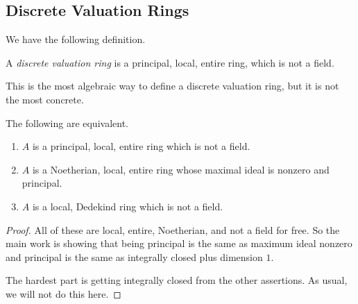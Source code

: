 \documentclass[../notes.tex]{subfiles}
\begin{document}
\subsection{Discrete Valuation Rings}
We have the following definition.
\begin{definition}
    A \textit{discrete valuation ring} is a principal, local, entire ring, which is not a field.
\end{definition}
This is the most algebraic way to define a discrete valuation ring, but it is not the most concrete.
\begin{proposition}
    The following are equivalent.
    \begin{enumerate}[label=(\alph*)]
        \item $A$ is a principal, local, entire ring which is not a field.
        \item $A$ is a Noetherian, local, entire ring whose maximal ideal is nonzero and principal.
        \item $A$ is a local, Dedekind ring which is not a field.
    \end{enumerate}
\end{proposition}
\begin{proof}
    All of these are local, entire, Noetherian, and not a field for free. So the main work is showing that being principal is the same as maximum ideal nonzero and principal is the same as integrally closed plus dimension $1.$

    The hardest part is getting integrally closed from the other assertions. As usual, we will not do this here.
\end{proof}
\end{document}
